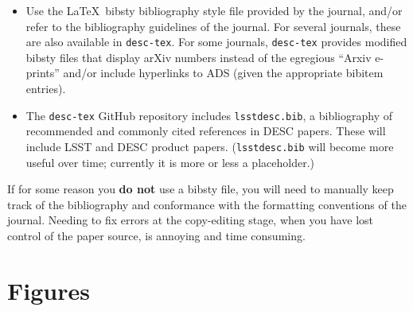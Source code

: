 \documentclass[letterpaper,11pt]{article}
\begin{document}
\begin{itemize}

\item
Use the La\TeX~bibsty bibliography style file provided by the journal, and/or refer to the bibliography guidelines of the journal.  For several journals, these are also available in {\tt desc-tex}.  For some journals,  {\tt desc-tex} provides modified bibsty files that display arXiv numbers instead of the egregious ``Arxiv e-prints'' and/or include hyperlinks to ADS (given the appropriate bibitem entries).

\item
The   {\tt desc-tex} GitHub repository includes {\tt lsstdesc.bib}, a bibliography of recommended and commonly cited references in DESC papers.  These will include LSST and DESC product papers.  ({\tt lsstdesc.bib} will become more useful over time; currently it is more or less a placeholder.)

\end{itemize}

If for some reason you {\bf do not} use a bibsty file, you will need to manually keep track of the bibliography and conformance with the formatting conventions of the journal.  Needing to fix errors at the copy-editing stage, when you have lost control of the paper source, is annoying and time consuming.

%

\section{Figures}
\end{document}
